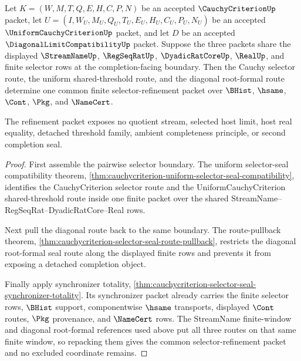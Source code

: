 \begin{theorem}
\label{thm:cauchycriterion-common-selector-refinement}
Let $K=(W,M,T,Q,E,H,C,P,N)$ be an accepted $\CauchyCriterionUp$ packet, let $U=(I,W_U,M_U,Q_U,T_U,E_U,H_U,C_U,P_U,N_U)$ be an accepted $\UniformCauchyCriterionUp$ packet, and let $D$ be an accepted $\DiagonalLimitCompatibilityUp$ packet. Suppose the three packets share the displayed $\StreamNameUp$, $\RegSeqRatUp$, $\DyadicRatCoreUp$, $\RealUp$, and finite selector rows at the completion-facing boundary. Then the Cauchy selector route, the uniform shared-threshold route, and the diagonal root-formal route determine one common finite selector-refinement packet over $\BHist$, $\hsame$, $\Cont$, $\Pkg$, and $\NameCert$.

The refinement packet exposes no quotient stream, selected host limit, host real equality, detached threshold family, ambient completeness principle, or second completion seal.
\end{theorem}
\begin{proof}
First assemble the pairwise selector boundary. The uniform selector-seal compatibility theorem, \autoref{thm:cauchycriterion-uniform-selector-seal-compatibility}, identifies the CauchyCriterion selector route and the UniformCauchyCriterion shared-threshold route inside one finite packet over the shared StreamName--RegSeqRat--DyadicRatCore--Real rows.

Next pull the diagonal route back to the same boundary. The route-pullback theorem, \autoref{thm:cauchycriterion-selector-seal-route-pullback}, restricts the diagonal root-formal seal route along the displayed finite rows and prevents it from exposing a detached completion object.

Finally apply synchronizer totality, \autoref{thm:cauchycriterion-selector-seal-synchronizer-totality}. Its synchronizer packet already carries the finite selector rows, $\BHist$ support, componentwise $\hsame$ transports, displayed $\Cont$ routes, $\Pkg$ provenance, and $\NameCert$ rows. The StreamName finite-window and diagonal root-formal references used above put all three routes on that same finite window, so repacking them gives the common selector-refinement packet and no excluded coordinate remains.
\end{proof}


